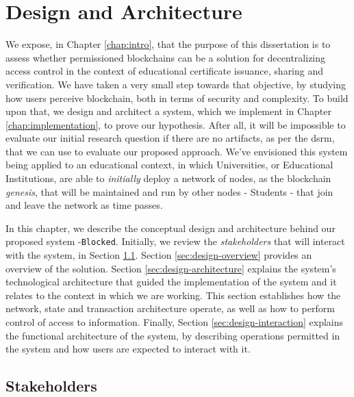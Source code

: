 \chapter{Design and Architecture}
\label{chap:design}

We expose, in Chapter \ref{chap:intro}, that the purpose of this dissertation is to assess whether permissioned blockchains can be a solution for decentralizing access control in the context of educational certificate issuance, sharing and verification. We have taken a very small step towards that objective, by studying how users perceive blockchain, both in terms of security and complexity. To build upon that, we design and architect a system, which we implement in Chapter \ref{chap:implementation}, to prove our hypothesis. After all, it will be impossible to evaluate our initial research question if there are no artifacts, as per the \gls{dsrm}, that we can use to evaluate our proposed approach. We've envisioned this system being applied to an educational context, in which Universities, or Educational Institutions, are able to \textit{initially} deploy a network of nodes, as the blockchain \textit{genesis}, that will be maintained and run by other nodes - Students - that join and leave the network as time passes.

In this chapter, we describe the conceptual design and architecture behind our proposed system -\texttt{Blocked}. Initially, we review the \textit{stakeholders} that will interact with the system, in Section \ref{sec:design-entities}. Section \ref{sec:design-overview} provides an overview of the solution. Section \ref{sec:design-architecture} explains the system's technological architecture that guided the implementation of the system and it relates to the context in which we are working. This section establishes how the network, state and transaction architecture operate, as well as how to perform control of access to information. Finally, Section \ref{sec:design-interaction} explains the functional architecture of the system, by describing operations permitted in the system and how users are expected to interact with it.

\section{Stakeholders}
\label{sec:design-entities}


